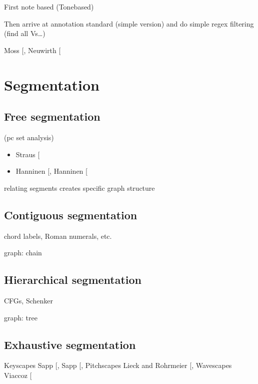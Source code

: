 \documentclass[letterpaper,10pt,english]{sphinxmanual}
\begin{document}
First note based (Tone\sphinxhyphen{}based)

Then arrive at annotation standard (simple version)
and do simple regex filtering (find all Vs…)

Moss  {[}\sphinxcite{8_bibliography:id20}{]}, Neuwirth  {[}\sphinxcite{8_bibliography:id31}{]}


\chapter{Segmentation}
\label{\detokenize{5_segmentation:segmentation}}\label{\detokenize{5_segmentation::doc}}

\section{Free segmentation}
\label{\detokenize{5_segmentation:free-segmentation}}
(pc set analysis)
\begin{itemize}
\item {} 
Straus {[}\sphinxcite{8_bibliography:id3}{]}

\item {} 
Hanninen {[}\sphinxcite{8_bibliography:id18}{]}, Hanninen {[}\sphinxcite{8_bibliography:id19}{]}

\end{itemize}

relating segments creates specific graph structure


\section{Contiguous segmentation}
\label{\detokenize{5_segmentation:contiguous-segmentation}}
chord labels, Roman numerals, etc.

graph: chain


\section{Hierarchical segmentation}
\label{\detokenize{5_segmentation:hierarchical-segmentation}}
CFGs, Schenker

graph: tree


\section{Exhaustive segmentation}
\label{\detokenize{5_segmentation:exhaustive-segmentation}}
Keyscapes Sapp {[}\sphinxcite{8_bibliography:id15}{]}, Sapp {[}\sphinxcite{8_bibliography:id16}{]},
Pitchscapes Lieck and Rohrmeier {[}\sphinxcite{8_bibliography:id14}{]},
Wavescapes Viaccoz  {[}\sphinxcite{8_bibliography:id17}{]}
\end{document}
